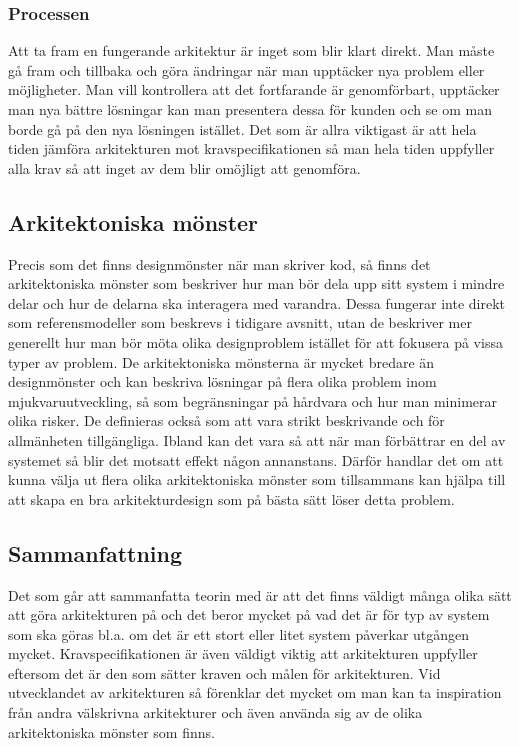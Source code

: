 \subsubsection{Processen}
Att ta fram en fungerande arkitektur är inget som blir klart direkt. Man måste gå fram och tillbaka och göra ändringar när man upptäcker nya problem eller möjligheter. Man vill kontrollera att det fortfarande är genomförbart, upptäcker man nya bättre lösningar kan man presentera dessa för kunden och se om man borde gå på den nya lösningen istället. Det som är allra viktigast är att hela tiden jämföra arkitekturen mot kravspecifikationen så man hela tiden uppfyller alla krav så att inget av dem blir omöjligt att genomföra. \cite[s. 228--230]{set} %

\subsection{Arkitektoniska mönster}
Precis som det finns designmönster när man skriver kod, så finns det arkitektoniska mönster som beskriver hur man bör dela upp sitt system i mindre delar och hur de delarna ska interagera med varandra. Dessa fungerar inte direkt som referensmodeller som beskrevs i tidigare avsnitt, utan de beskriver mer generellt hur man bör möta olika designproblem istället för att fokusera på vissa typer av problem. \cite[s. 226--228]{set}
\newline
\newline
De arkitektoniska mönsterna är mycket bredare än designmönster och kan beskriva lösningar på flera olika problem inom mjukvaruutveckling, så som begränsningar på hårdvara och hur man minimerar olika risker. De definieras också som att vara strikt beskrivande och för allmänheten tillgängliga. \cite[s. 226--228]{set}
\newline
\newline
Ibland kan det vara så att när man förbättrar en del av systemet så blir det motsatt effekt någon annanstans. Därför handlar det om att kunna välja ut flera olika arkitektoniska mönster som tillsammans kan hjälpa till att skapa en bra arkitekturdesign som på bästa sätt löser detta problem. \cite[s. 226--228]{set}

\subsection{Sammanfattning}
Det som går att sammanfatta teorin med är att det finns väldigt många olika sätt att göra arkitekturen på och det beror mycket på vad det är för typ av system som ska göras bl.a. om det är ett stort eller litet system påverkar utgången mycket. Kravspecifikationen är även väldigt viktig att arkitekturen uppfyller eftersom det är den som sätter kraven och målen för arkitekturen.
\newline
\newline
Vid utvecklandet av arkitekturen så förenklar det mycket om man kan ta inspiration från andra välskrivna arkitekturer och även använda sig av de olika arkitektoniska mönster som finns.
